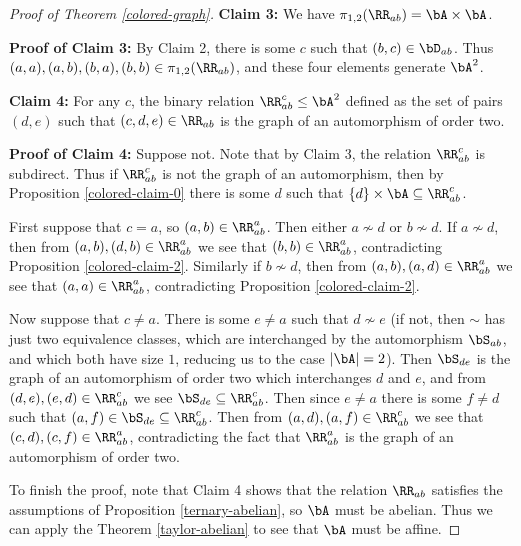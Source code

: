 \begin{proof}[Proof of Theorem \ref{colored-graph}]
{\bf Claim 3:} We have $\pi_{1,2}(\RR_{ab}) = \bA\times \bA$.

{\bf Proof of Claim 3:} By Claim 2, there is some $c$ such that $(b,c) \in \bD_{ab}$. Thus $(a,a),(a,b),(b,a),(b,b) \in \pi_{1,2}(\RR_{ab})$, and these four elements generate $\bA^2$.

{\bf Claim 4:} For any $c$, the binary relation $\RR_{ab}^c \le \bA^2$ defined as the set of pairs $(d,e)$ such that $(c,d,e) \in \RR_{ab}$ is the graph of an automorphism of order two.

{\bf Proof of Claim 4:} Suppose not. Note that by Claim 3, the relation $\RR_{ab}^c$ is subdirect. Thus if $\RR_{ab}^c$ is not the graph of an automorphism, then by Proposition \ref{colored-claim-0} there is some $d$ such that $\{d\}\times \bA \subseteq \RR_{ab}^c$.

First suppose that $c = a$, so $(a,b) \in \RR_{ab}^a$. Then either $a \not\sim d$ or $b \not\sim d$. If $a \not\sim d$, then from $(a,b),(d,b) \in \RR_{ab}^a$ we see that $(b,b) \in \RR_{ab}^a$, contradicting Proposition \ref{colored-claim-2}. Similarly if $b \not\sim d$, then from $(a,b),(a,d) \in \RR_{ab}^a$ we see that $(a,a) \in \RR_{ab}^a$, contradicting Proposition \ref{colored-claim-2}.

Now suppose that $c \ne a$. There is some $e \ne a$ such that $d \not\sim e$ (if not, then $\sim$ has just two equivalence classes, which are interchanged by the automorphism $\bS_{ab}$, and which both have size $1$, reducing us to the case $|\bA| = 2$). Then $\bS_{de}$ is the graph of an automorphism of order two which interchanges $d$ and $e$, and from $(d,e), (e,d) \in \RR_{ab}^c$ we see $\bS_{de} \subseteq \RR_{ab}^c$. Then since $e \ne a$ there is some $f \ne d$ such that $(a,f) \in \bS_{de} \subseteq \RR_{ab}^c$. Then from $(a,d), (a,f) \in \RR_{ab}^c$ we see that $(c,d), (c,f) \in \RR_{ab}^a$, contradicting the fact that $\RR_{ab}^a$ is the graph of an automorphism of order two.

To finish the proof, note that Claim 4 shows that the relation $\RR_{ab}$ satisfies the assumptions of Proposition \ref{ternary-abelian}, so $\bA$ must be abelian. Thus we can apply the Theorem \ref{taylor-abelian} to see that $\bA$ must be affine.
\end{proof}
